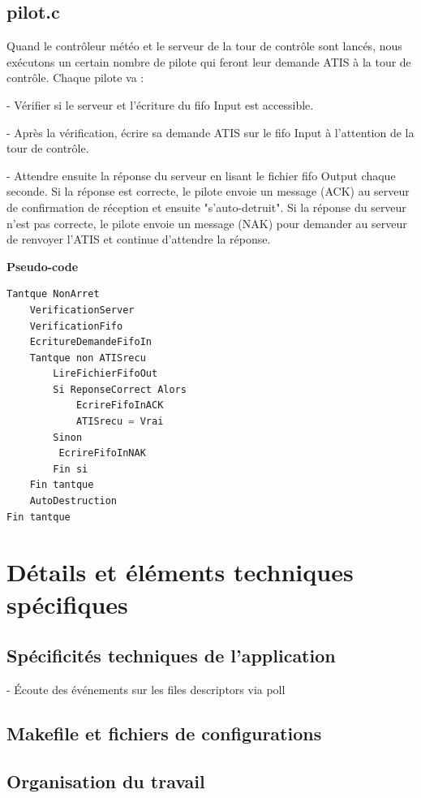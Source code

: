\documentclass{report}
\begin{document}
{	\section{pilot.c}
		
 Quand le contrôleur météo et le serveur de la tour de contrôle sont lancés, nous exécutons un certain nombre de pilote qui feront leur demande ATIS à la tour de contrôle.
		Chaque pilote va : 
		
		- Vérifier si le serveur et l'écriture du fifo Input est accessible.
		
		- Après la vérification, écrire sa demande ATIS sur le fifo Input à l'attention de la tour de contrôle.
		
		- Attendre ensuite la réponse du serveur en lisant le fichier fifo Output chaque seconde. Si la réponse est correcte, le pilote envoie un message (ACK) au serveur de confirmation de réception et ensuite "s'auto-detruit".  Si la réponse du serveur n'est pas correcte, le pilote envoie un message (NAK) pour demander au serveur de renvoyer l'ATIS et continue d'attendre la réponse.
\newline

\textbf{Pseudo-code}

\begin{lstlisting}[language=C]
Tantque NonArret
	VerificationServer
	VerificationFifo
	EcritureDemandeFifoIn
	Tantque non ATISrecu
		LireFichierFifoOut
		Si ReponseCorrect Alors
			EcrireFifoInACK
			ATISrecu = Vrai 
		Sinon
		 EcrireFifoInNAK
		Fin si
	Fin tantque
	AutoDestruction
Fin tantque 
\end{lstlisting}

\chapter{Détails et éléments techniques spécifiques}

	\section{Spécificités techniques de l'application}

		- Écoute des événements sur les files descriptors via poll

	\section{Makefile et fichiers de configurations}

	\section{Organisation du travail}

}
\end{document}

